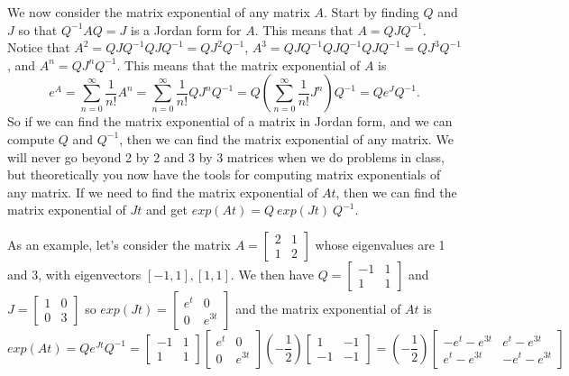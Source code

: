 \documentclass[10pt]{article}
\theoremstyle{plain}
\theoremstyle{box}
\begin{document}
We now consider the matrix exponential of any matrix $A$.  Start by finding $Q$ and $J$ so that $Q^{-1}AQ=J$ is a Jordan form for $A$.  This means that $A=Q J Q^{-1}$.  Notice that 
$A^2 = Q J Q^{-1}Q J Q^{-1} = Q J^2 Q^{-1}$, 
$A^3 = Q J Q^{-1}Q J Q^{-1}Q J Q^{-1} = Q J^3 Q^{-1}$, and 
$A^n = Q J^n Q^{-1}$.  This means that the matrix exponential of $A$ is 
$$e^A = \sum_{n=0}^\infty \frac{1}{n!}A^n = \sum_{n=0}^\infty \frac{1}{n!}Q J^nQ^{-1} = Q\left(\sum_{n=0}^\infty \frac{1}{n!}J^n\right)Q^{-1} = Q e^J Q^{-1}.$$ So if we can find the matrix exponential of a matrix in Jordan form, and we can compute $Q$ and $Q^{-1}$, then we can find the matrix exponential of any matrix.  We will never go beyond 2 by 2 and 3 by 3 matrices when we do problems in class, but theoretically you now have the tools for computing matrix exponentials of any matrix.
If we need to find the matrix exponential of $At$, then we can find the matrix exponential of $Jt$ and get $exp(At)=Q\ exp(Jt)\ Q^{-1}$.  

As an example, let's consider the matrix 
$A=
\begin{bmatrix}
 2 & 1 \\
 1 & 2
\end{bmatrix}
$ whose eigenvalues are 1 and 3, with eigenvectors $[-1,1],[1,1]$.
We then have 
$Q=
\begin{bmatrix}
 -1 & 1 \\
 1 & 1
\end{bmatrix}
$ and 
$J=
\begin{bmatrix}
 1 & 0 \\
 0 & 3
\end{bmatrix}
$ 
so $exp(Jt) = 
\begin{bmatrix}
 e^{t} & 0 \\
 0 & e^{3t}
\end{bmatrix}
$ and the matrix exponential of $At$ is 
$$exp(At) = Q e^{Jt}Q^{-1} =
\begin{bmatrix}
 -1 & 1 \\
 1 & 1
\end{bmatrix}
\begin{bmatrix}
 e^{t} & 0 \\
 0 & e^{3t}
\end{bmatrix}
\left(-\frac{1}{2}\right)
\begin{bmatrix}
 1 & -1 \\
 -1 & -1
\end{bmatrix}
=
\left(-\frac{1}{2}\right)
\begin{bmatrix}
 -e^t-e^{3 t} & e^t-e^{3 t} \\
 e^t-e^{3 t} & -e^t-e^{3 t}
\end{bmatrix}
$$
\end{document}
